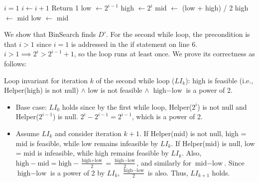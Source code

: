 \documentclass[11pt]{article}
\begin{document}


\begin{algorithm}[H]
\caption{Binary search for the smallest feasible $D$}
\begin{algorithmic}[1]
\State $i=1$
  \State $i \gets i+1$ \EndWhile
{} \State Return 1 \EndIf
\State low $\gets 2^{i-1}$
\State high $\gets 2^i$
\State mid $\gets$ (low + high) / 2
 \State high $\gets$ mid
\Else \State low $\gets$ mid
\EndIf
\EndWhile\\
\EndFunction
\end{algorithmic}
\end{algorithm}

We show that BinSearch finds $D'$. For the second while loop, the precondition is that $i>1$ since $i=1$ is addressed in the if statement on line 6. $i>1\implies 2^i>2^{i-1}+1$, so the loop runs at least once. We prove its correctness as follows:

Loop invariant for iteration $k$ of the second while loop ($LI_k$): high is feasible (i.e., Helper(high) is not null) $\land$ low is not feasible $\land$ $\text{high}-\text{low}$ is a power of 2.

\begin{itemize}
    \item Base case: $LI_0$ holds since by the first while loop, Helper($2^i$) is not null and Helper($2^{i-1}$) is null. $2^i-2^{i-1}=2^{i-1}$, which is a power of 2.
    \item Assume $LI_k$ and consider iteration $k+1$. If Helper(mid) is not null, high = mid is feasible, while low remains infeasible by $LI_k$. If Helper(mid) is null, low = mid is infeasible, while high remains feasible by $LI_k$. Also, $\text{high}-\text{mid}=\text{high}-\frac{\text{high}+\text{low}}{2}=\frac{\text{high}-\text{low}}{2}$, and similarly for $\text{mid}-\text{low}$. Since $\text{high}-\text{low}$ is a power of 2 by $LI_k$, $\frac{\text{high}-\text{low}}{2}$ is also. Thus, $LI_{k+1}$ holds.
\end{itemize}
\end{document}

